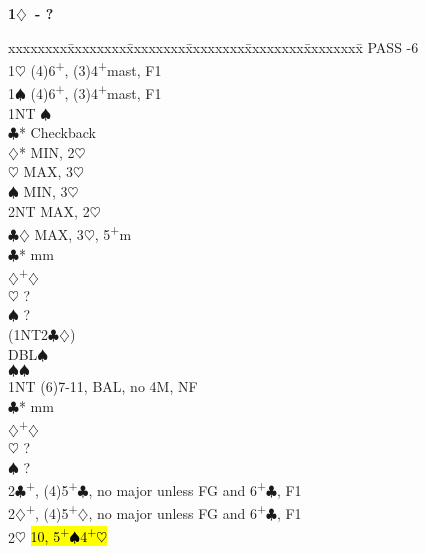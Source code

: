 \documentclass[10pt]{article}
\renewcommand{\c}{$\clubsuit$}
\renewcommand{\d}{$\diamondsuit$}
\newcommand{\h}{$\heartsuit$}
\newcommand{\s}{$\spadesuit$}
\newcommand{\p}{\textsuperscript{+}}
\newcommand{\m}{\textsuperscript{\textminus}}
\newcommand{\x}{DBL}
\newenvironment{bidtable}[1][]
{\textbf{#1}
  \begin{adjustwidth}{1em}{}
    \addvspace{2pt}
    \begin{tabbing}
      xxxxxxxx\=xxxxxxxx\=xxxxxxxx\=xxxxxxxx\=xxxxxxxx\=xxxxxxxx\=\kill}
{\end{tabbing}\end{adjustwidth}\bigskip}%
\begin{document}
\begin{multicols*}{2}
\begin{bidtable}[1\d\ - ?]
PASS      -6                                              \\
1\h       \> (4)6\p , (3)4\p mast, F1                            \\
1\s       \> (4)6\p , (3)4\p mast, F1                            \\
          \> 1NT        \m\s                              \\
          \>            \c* \> Checkback                  \\
          \>            \>      \d*  \> MIN, 2\m\h        \\
          \>            \>      \h   \> MAX, 3\h          \\
          \>            \>      \s   \> MIN, 3\h          \\
          \>            \>      \> 2NT   \> MAX, 2\m\h        \\
          \>            \>      \c\d \> MAX, 3\h, 5\p m   \\
          \c*       {} mm                              \\
          \d        {}\p\d                              \\
          \h        \> ?                                  \\
          \s        \> ?                                  \\
          \> (1NT2\c\d) \>                                    \\
          \>            \> \x   {}\s                        \\
          \>            \s  {}\s                        \\
1NT       \> (6)7-11\m, BAL, no 4M, NF                         \\
          \c*       {} mm                              \\
          \d        {}\p\d                              \\
          \h        \> ?                                  \\
          \s        \> ?                                  \\
2\c       {}\p, (4)5\p\c, no major unless FG and 6\p\c, F1 \\
2\d       {}\p, (4)5\p\d, no major unless FG and 6\p\c, F1 \\
2\h       \> \hl{10\m, 5\p\s 4\p\h}                             \\

\end{bidtable}
\end{multicols*}
\end{document}
